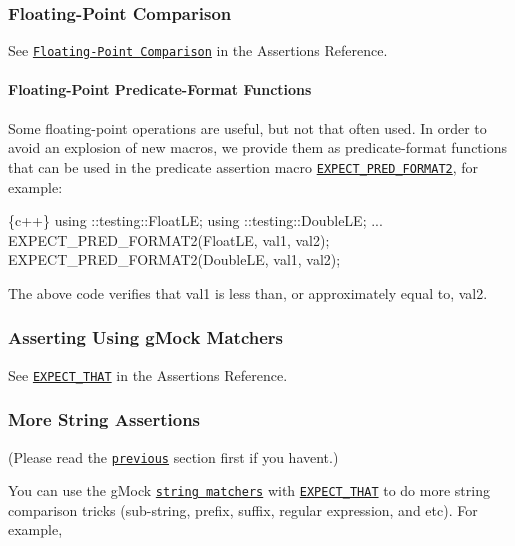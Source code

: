 \subsubsection*{Floating-\/\+Point Comparison}

See \href{reference/assertions.md#floating-point}{\tt Floating-\/\+Point Comparison} in the Assertions Reference.

\paragraph*{Floating-\/\+Point Predicate-\/\+Format Functions}

Some floating-\/point operations are useful, but not that often used. In order to avoid an explosion of new macros, we provide them as predicate-\/format functions that can be used in the predicate assertion macro \href{reference/assertions.md#EXPECT_PRED_FORMAT}{\tt {\ttfamily E\+X\+P\+E\+C\+T\+\_\+\+P\+R\+E\+D\+\_\+\+F\+O\+R\+M\+A\+T2}}, for example\+:


\begin{DoxyCode}
\{c++\}
using ::testing::FloatLE;
using ::testing::DoubleLE;
...
EXPECT\_PRED\_FORMAT2(FloatLE, val1, val2);
EXPECT\_PRED\_FORMAT2(DoubleLE, val1, val2);
\end{DoxyCode}


The above code verifies that {\ttfamily val1} is less than, or approximately equal to, {\ttfamily val2}.

\subsubsection*{Asserting Using g\+Mock Matchers}

See \href{reference/assertions.md#EXPECT_THAT}{\tt {\ttfamily E\+X\+P\+E\+C\+T\+\_\+\+T\+H\+AT}} in the Assertions Reference.

\subsubsection*{More String Assertions}

(Please read the \href{#asserting-using-gmock-matchers}{\tt previous} section first if you haven\textquotesingle{}t.)

You can use the g\+Mock \href{reference/matchers.md#string-matchers}{\tt string matchers} with \href{reference/assertions.md#EXPECT_THAT}{\tt {\ttfamily E\+X\+P\+E\+C\+T\+\_\+\+T\+H\+AT}} to do more string comparison tricks (sub-\/string, prefix, suffix, regular expression, and etc). For example,


